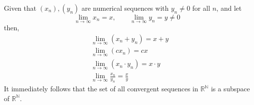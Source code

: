   \begin{theorem}
    Given that $(x_n), (y_n)$ are numerical sequences with $y_n \neq 0$ for all $n$, and let 
    \begin{equation}
      \lim_{n \rightarrow \infty} x_n = x, \qquad \lim_{n \rightarrow \infty} y_n = y \neq 0
    \end{equation}
    then, 
    \begin{align}
      & \lim_{n\rightarrow \infty} (x_n + y_n) = x + y \\
      & \lim_{n \rightarrow \infty} (c x_n) = c x \\
      & \lim_{n \rightarrow \infty} (x_n \cdot y_n) = x \cdot y \\
      & \lim_{n \rightarrow \infty} \frac{x_n}{y_n} = \frac{x}{y}
    \end{align}
    It immediately follows that the set of all convergent sequences in $\mathbb{R}^\mathbb{N}$ is a subspace of $\mathbb{R}^\mathbb{N}$. 
  \end{theorem}
